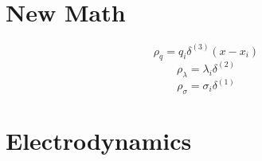 \documentclass[12pt]{article}
\begin{document}
\section{New Math} \label{section2}
    \begin{equation} \label{eq: 2-1}
        \rho_q = q_i \delta^{(3)} (x-x_i)    
    \end{equation}
    \begin{equation} \label{eq: 2-2}
        \rho_\lambda = \lambda_i \delta^{(2)}     
    \end{equation}
    \begin{equation} \label{eq: 2-3}
        \rho_\sigma = \sigma_i \delta^{(1)}     
    \end{equation}

\section{Electrodynamics} \label{section3}
\end{document}
